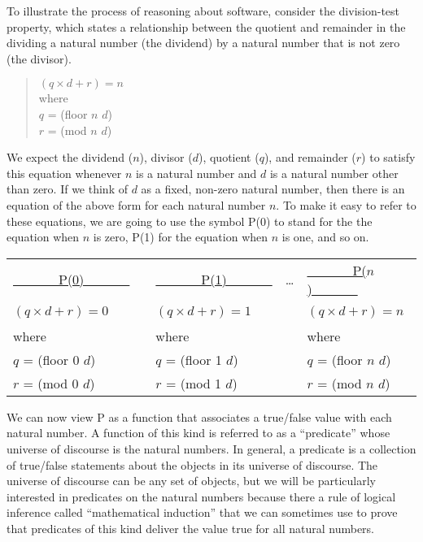 To illustrate the process of reasoning about software, consider the division-test property, which states a relationship between the quotient and remainder in the dividing a natural number (the dividend) by a natural number that is not zero (the divisor).

\begin{quote}
$(q \times d + r) = n$ \\
where \\
$q$ = (floor $n$ $d$) \\
$r$ = (mod $n$ $d$)
\end{quote}

We expect the dividend ($n$), divisor ($d$), quotient ($q$), and remainder ($r$) to satisfy this equation whenever $n$ is a natural number and $d$ is a natural number other than zero. If we think of $d$ as a fixed, non-zero natural number, then there is an equation of the above form for each natural number $n$. To make it easy to refer to these equations, we are going to use the symbol P(0) to stand for the the equation when $n$ is zero, P(1) for the equation when $n$ is one, and so on.

\begin{tabular}{lllll}
\underline{~~~~~~~P(0)~~~~~~~} & & \underline{~~~~~~~P(1)~~~~~~~} &  \dots & \underline{~~~~~~~P($n$)~~~~~~~} \\
$(q \times d + r) = 0$ & & $(q \times d + r) = 1$ &  ~     & $(q \times d + r) = n$ \\
where                  & & where                  &        & where                  \\
$q$ = (floor 0 $d$)    & & $q$ = (floor 1 $d$)    &  ~     & $q$ = (floor $n$ $d$)  \\
$r$ = (mod 0 $d$)      & & $r$ = (mod 1 $d$)      &  ~     & $r$ = (mod $n$ $d$)    \\
\end{tabular}

We can now view P as a function that associates a true/false value with each natural number. A function of this kind is referred to as a ``predicate'' whose universe of discourse is the natural numbers. In general, a predicate is a collection of true/false statements about the objects in its universe of discourse. The universe of discourse can be any set of objects, but we will be particularly interested in predicates on the natural numbers because there a rule of logical inference called ``mathematical induction'' that we can sometimes use to prove that predicates of this kind deliver the value true for all natural numbers.

